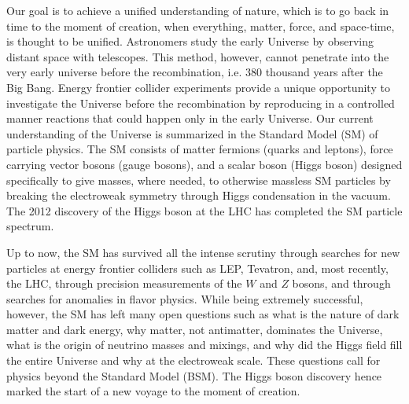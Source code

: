 
Our goal is to achieve a unified understanding of nature, which is to go back in time to the moment of creation, when everything, matter, force, and space-time, is thought to be unified. Astronomers study the early Universe by observing distant space with telescopes. This method, however, cannot penetrate into the very early universe before the recombination, i.e. 380 thousand years after the Big Bang. Energy frontier collider experiments provide a unique opportunity to investigate the Universe before the recombination by reproducing in a controlled manner reactions that could happen only in the early Universe. Our current understanding of the Universe is summarized in the Standard Model (SM) of particle physics. The SM consists of matter fermions (quarks and leptons), force carrying vector bosons (gauge bosons), and a scalar boson (Higgs boson) designed specifically to give masses, where needed, to otherwise massless SM particles by breaking the electroweak symmetry through Higgs condensation in the vacuum. The 2012 discovery of the Higgs boson at the LHC has completed the SM particle spectrum. 

Up to now, the SM has survived all the intense scrutiny through searches for new particles at energy frontier colliders such as LEP, Tevatron, and, most recently, the LHC, through precision measurements of the $W$ and $Z$ bosons, and through searches for anomalies in flavor physics. While being extremely successful, however, the SM has left many open questions such as what is the nature of dark matter and dark energy,  why matter, not antimatter, dominates the Universe, what is the origin of neutrino masses and mixings, and why did the Higgs field fill the entire Universe and why at the electroweak scale. These questions call for physics beyond the Standard Model (BSM). The Higgs boson discovery hence marked the start of a new voyage to the moment of creation.

